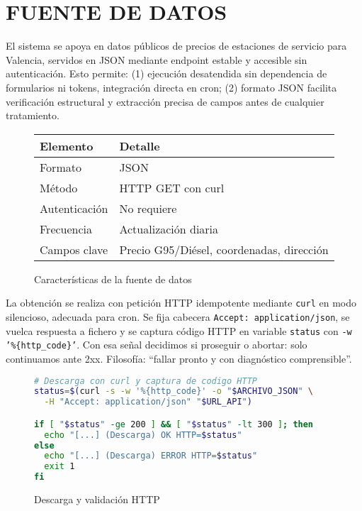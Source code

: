 \chapter{FUENTE DE DATOS}

El sistema se apoya en datos públicos de precios de estaciones de servicio para Valencia, servidos en JSON mediante endpoint estable y accesible sin autenticación. Esto permite: (1) ejecución desatendida sin dependencia de formularios ni tokens, integración directa en cron; (2) formato JSON facilita verificación estructural y extracción precisa de campos antes de cualquier tratamiento.

\begin{figure}[H]
  \centering
  \footnotesize
  \begin{tabular}{ll}
    \toprule
    \textbf{Elemento} & \textbf{Detalle}                          \\
    \midrule
    Formato           & JSON                                      \\
    Método            & HTTP GET con curl                         \\
    Autenticación     & No requiere                               \\
    Frecuencia        & Actualización diaria                      \\
    Campos clave      & Precio G95/Diésel, coordenadas, dirección \\
    \bottomrule
  \end{tabular}
  \caption{Características de la fuente de datos}
\end{figure}

La obtención se realiza con petición HTTP idempotente mediante \texttt{curl} en modo silencioso, adecuada para cron. Se fija cabecera \texttt{Accept: application/json}, se vuelca respuesta a fichero y se captura código HTTP en variable \texttt{status} con \texttt{-w '\%\{http\_code\}'}. Con esa señal decidimos si proseguir o abortar: solo continuamos ante 2xx. Filosofía: ``fallar pronto y con diagnóstico comprensible''.

\begin{figure}[H]
  \footnotesize
  \begin{lstlisting}[language=bash]
# Descarga con curl y captura de codigo HTTP
status=$(curl -s -w '%{http_code}' -o "$ARCHIVO_JSON" \
  -H "Accept: application/json" "$URL_API")

if [ "$status" -ge 200 ] && [ "$status" -lt 300 ]; then
  echo "[...] (Descarga) OK HTTP=$status"
else
  echo "[...] (Descarga) ERROR HTTP=$status"
  exit 1
fi
\end{lstlisting}
  \caption{Descarga y validación HTTP}
\end{figure}

